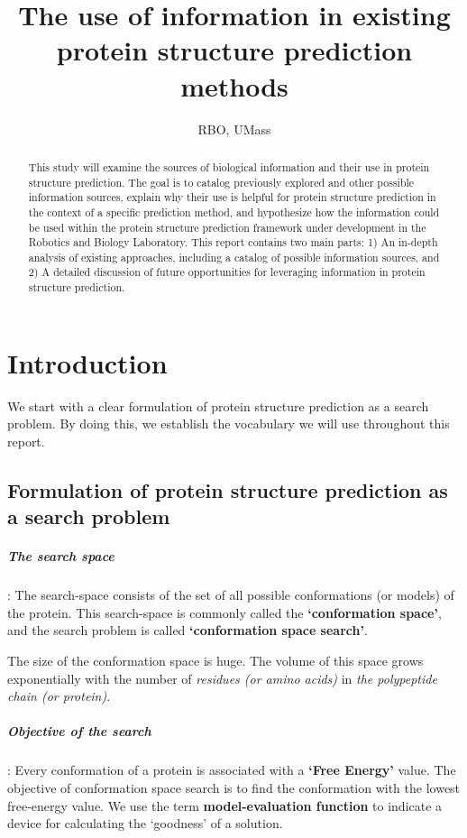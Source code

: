 \documentclass[10pt]{report}
\title{The use of information in existing protein structure prediction methods}
\author{RBO, UMass}
\begin{document}
\maketitle
\tableofcontents

\begin{abstract}
This study will examine the sources of biological information and their use in protein structure prediction. The goal is to catalog previously explored and other possible information sources, explain why their use is helpful for protein structure prediction in the context of a specific prediction method, and hypothesize how the information could be used within the protein structure prediction framework under development in the Robotics and Biology Laboratory. This report contains two main parts: 1) An in-depth analysis of existing approaches, including a catalog of possible information sources, and 2) A detailed discussion of future opportunities for leveraging information in protein structure prediction.
\end{abstract}

\chapter{Introduction}

We start with a clear formulation of protein structure prediction as a search problem. By doing this, we establish the vocabulary we will use throughout this report.

\section{Formulation of protein structure prediction as a search problem}

\paragraph{The search space}: The search-space consists of the set of all possible conformations (or models) of the protein. This search-space is commonly called the \textbf{`conformation space'}, and the search problem is called \textbf{`conformation space search'}.

The size of the conformation space is huge. The volume of this space grows exponentially with the number of \textit{residues (or amino acids)} in \textit{the polypeptide chain (or protein)}.

\paragraph{Objective of the search}: Every conformation of a protein is associated with a \textbf{`Free Energy'} value. The objective of conformation space search is to find the conformation with the lowest free-energy value. We use the term \textbf{model-evaluation function} to indicate a device for calculating the `goodness' of a solution.
\end{document}
